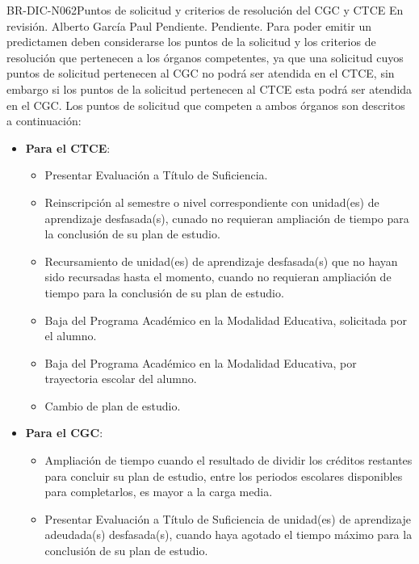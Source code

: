 \begin{BusinessRule}{BR-DIC-N062}{Puntos de solicitud y criterios de resolución del CGC y CTCE}
	{\bcCondition} %
	{\btEnabler}     %
	{\blControlling}     %
	\BRItem[Estado] En revisión.
	 Alberto García Paul 
	 Pendiente.
	 Pendiente. 
	\BRItem[Descripción] Para poder emitir un predictamen deben considerarse los puntos de la solicitud y los criterios de resolución que pertenecen a los órganos competentes, ya que una solicitud cuyos puntos de solicitud pertenecen al CGC no podrá ser atendida en el CTCE, sin embargo si los puntos de la solicitud pertenecen al CTCE esta podrá ser atendida en el CGC. Los puntos de solicitud que competen a ambos órganos son descritos a continuación:
	\begin{itemize}
		\item \textbf{Para el CTCE}:
			\begin{itemize}
				\item Presentar Evaluación a Título de Suficiencia.
				\item Reinscripción al semestre o nivel correspondiente con unidad(es) de aprendizaje desfasada(s), cunado no requieran ampliación de tiempo para la conclusión de su plan de estudio.
				\item Recursamiento de unidad(es) de aprendizaje desfasada(s) que no hayan sido recursadas hasta el momento, cuando no requieran ampliación de tiempo para la conclusión de su plan de estudio.
				\item Baja del Programa Académico en la Modalidad Educativa, solicitada por el alumno.
				\item Baja del Programa Académico en la Modalidad Educativa, por trayectoria escolar del alumno. 
				\item Cambio de plan de estudio.
			\end{itemize}
		\item \textbf{Para el CGC}:
			\begin{itemize}
				\item Ampliación de tiempo cuando el resultado de dividir los créditos restantes para concluir su plan de estudio, entre los periodos escolares disponibles para completarlos, es mayor a la carga media.
				\item Presentar Evaluación a Título de Suficiencia de unidad(es) de aprendizaje adeudada(s) desfasada(s), cuando haya agotado el tiempo máximo para la conclusión de su plan de estudio.

\end{itemize}
\end{itemize}
\end{BusinessRule}
